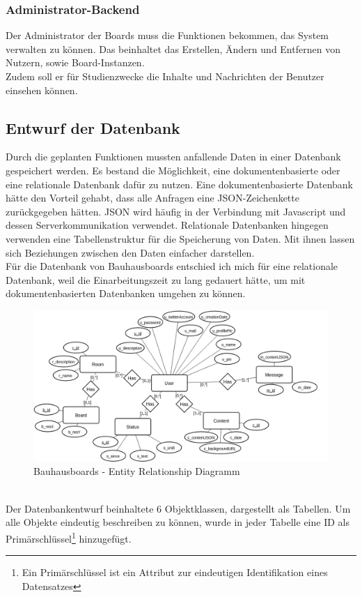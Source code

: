 \subsubsection{Administrator-Backend}\label{Administrator-Backend}
Der Administrator der Boards muss die Funktionen bekommen, das System verwalten zu können. Das beinhaltet das Erstellen, Ändern und Entfernen von Nutzern, sowie Board-Instanzen.
\\
Zudem soll er für Studienzwecke die Inhalte und Nachrichten der Benutzer einsehen können.

\subsection{Entwurf der Datenbank}\label{Entwurf der Datenbank}
Durch die geplanten Funktionen mussten anfallende Daten in einer Datenbank gespeichert werden.
Es bestand die Möglichkeit, eine dokumentenbasierte oder eine relationale Datenbank dafür zu nutzen.
Eine dokumentenbasierte Datenbank hätte den Vorteil gehabt, dass alle Anfragen eine JSON-Zeichenkette zurückgegeben hätten. JSON wird häufig in der Verbindung mit Javascript und dessen Serverkommunikation verwendet.
Relationale Datenbanken hingegen verwenden eine Tabellenstruktur für die Speicherung von Daten. Mit ihnen lassen sich Beziehungen zwischen den Daten einfacher darstellen.
\\
Für die Datenbank von Bauhausboards entschied ich mich für eine relationale Datenbank, weil die Einarbeitungszeit zu lang gedauert hätte, um mit dokumentenbasierten Datenbanken umgehen zu können.
\begin{figure}[h!]
  \centering
    \includegraphics[width=1\textwidth]{./img/ER01.png}
  \caption{Bauhausboards - Entity Relationship Diagramm}
  \label{img:ER01}
\end{figure}
\\
Der Datenbankentwurf beinhaltete 6 Objektklassen, dargestellt als Tabellen. Um alle Objekte eindeutig beschreiben zu können, wurde in jeder Tabelle eine ID als Primärschlüssel\footnote{Ein Primärschlüssel ist ein Attribut zur eindeutigen Identifikation eines Datensatzes} hinzugefügt.
